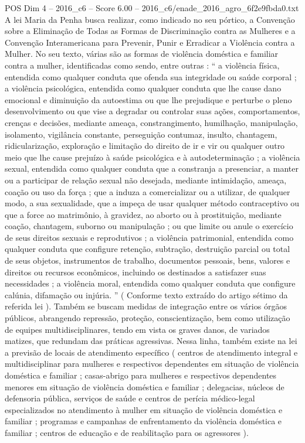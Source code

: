 \begin{textsample}{POS Dim 4 – 2016\_c6 – Score 6.00 – 2016\_c6/enade\_2016\_agro\_6f2e9fbda0.txt}
A lei Maria da Penha busca realizar, como indicado no seu pórtico, a Convenção sobre a Eliminação de Todas as Formas de Discriminação contra as Mulheres e a Convenção Interamericana para Prevenir, Punir e Erradicar a Violência contra a Mulher.
No seu texto, várias são as formas de violência doméstica e familiar contra a mulher, identificadas como sendo, entre outras : “ a violência física, entendida como qualquer conduta que ofenda sua integridade ou saúde corporal ; a violência psicológica, entendida como qualquer conduta que lhe cause dano emocional e diminuição da autoestima ou que lhe prejudique e perturbe o pleno desenvolvimento ou que vise a degradar ou controlar suas ações, comportamentos, crenças e decisões, mediante ameaça, constrangimento, humilhação, manipulação, isolamento, vigilância constante, perseguição contumaz, insulto, chantagem, ridicularização, exploração e limitação do direito de ir e vir ou qualquer outro meio que lhe cause prejuízo à saúde psicológica e à autodeterminação ; a violência sexual, entendida como qualquer conduta que a constranja a presenciar, a manter ou a participar de relação sexual não desejada, mediante intimidação, ameaça, coação ou uso da força ; que a induza a comercializar ou a utilizar, de qualquer modo, a sua sexualidade, que a impeça de usar qualquer método contraceptivo ou que a force ao matrimônio, à gravidez, ao aborto ou à prostituição, mediante coação, chantagem, suborno ou manipulação ; ou que limite ou anule o exercício de seus direitos sexuais e reprodutivos ; a violência patrimonial, entendida como qualquer conduta que configure retenção, subtração, destruição parcial ou total de seus objetos, instrumentos de trabalho, documentos pessoais, bens, valores e direitos ou recursos econômicos, incluindo os destinados a satisfazer suas necessidades ; a violência moral, entendida como qualquer conduta que configure calúnia, difamação ou injúria. ” ( Conforme texto extraído do artigo sétimo da referida lei ).
Também se buscam medidas de integração entre os vários órgãos públicos, abrangendo repressão, proteção, conscientização, bem como utilização de equipes multidisciplinares, tendo em vista os graves danos, de variados matizes, que redundam das práticas agressivas.
Nessa linha, também existe na lei a previsão de locais de atendimento específico ( centros de atendimento integral e multidisciplinar para mulheres e respectivos dependentes em situação de violência doméstica e familiar ; casas-abrigo para mulheres e respectivos dependentes menores em situação de violência doméstica e familiar ; delegacias, núcleos de defensoria pública, serviços de saúde e centros de perícia médico-legal especializados no atendimento à mulher em situação de violência doméstica e familiar ; programas e campanhas de enfrentamento da violência doméstica e familiar ; centros de educação e de reabilitação para os agressores ).

\end{textsample}
